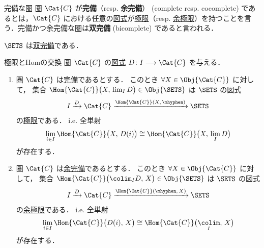 \documentclass[TQFT_main]{subfiles}
\begin{document}
\begin{mydef}[label=def:complete]{完備な圏}
    圏 $\Cat{C}$ が\textbf{完備}（resp. \textbf{余完備}） (complete resp. cocomplete) であるとは，$\Cat{C}$ における任意の\hyperref[def:diagram]{図式}が\hyperref[def:lim]{極限}（resp. \hyperref[def:colim]{余極限}）を持つことを言う．完備かつ余完備な圏は\textbf{双完備} (bicomplete) であると言われる．
\end{mydef}

$\SETS$ は\hyperref[def:complete]{双完備}である．

\begin{myprop}[label=prop:lim-colim-basic,breakable]{極限とHomの交換}
    圏 $\Cat{C}$ の\hyperref[def:diagram]{図式} $D \colon I \lto \Cat{C}$ を与える．
    \begin{enumerate}
        \item 圏 $\Cat{C}$ は\hyperref[def:complete]{完備}であるとする．
        このとき $\forall X \in \Obj{\Cat{C}}$ に対して，
        集合 $\Hom{\Cat{C}} \bigl( X,\, \lim_I D \bigr) \in \Obj{\SETS}$ は $\SETS$ の図式
        \begin{align}
            \label{eq:diag-post}
            I \xrightarrow{D} \Cat{C} \xrightarrow{\Hom{\Cat{C}}(X,\, \mhyphen)} \SETS
        \end{align}
        の\hyperref[def:lim]{極限}である．
        i.e. 全単射
        \begin{align}
            \lim_{i \in I} \Hom{\Cat{C}} \bigl( X,\, D(i) \bigr) \cong \Hom{\Cat{C}} \bigl( X,\, \lim_I D \bigr) 
        \end{align}
        が存在する．
        \item  圏 $\Cat{C}$ は\hyperref[def:complete]{余完備}であるとする．
        このとき $\forall X \in \Obj{\Cat{C}}$ に対して，
        集合 $\Hom{\Cat{C}} \bigl( \colim_I D,\, X \bigr) \in \Obj{\SETS}$ は $\SETS$ の図式
        \begin{align}
            \label{eq:diag-pre}
            I \xrightarrow{D} \Cat{C} \xrightarrow{\Hom{\Cat{C}}(\mhyphen,\, X)} \SETS
        \end{align}
        の\hyperref[def:colim]{余極限}である．
        i.e. 全単射
        \begin{align}
            \lim_{i \in I} \Hom{\Cat{C}} \bigl( D(i),\, X\bigr) \cong \Hom{\Cat{C}} \bigl(\underset{I}{\colim},\, X \bigr) 
        \end{align}
        が存在する．
    \end{enumerate}
\end{myprop}
\end{document}
